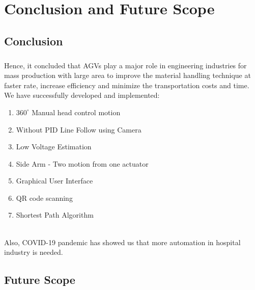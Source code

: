 \chapter{Conclusion and Future Scope}
\section{Conclusion}
\paragraph{}Hence, it concluded that AGVs play a major role in engineering industries for mass production with large area to improve the material handling technique at faster rate, increase efficiency and minimize the transportation costs and time. \\
\newline
We have successfully developed and implemented:
\begin{enumerate}
    \item $360^{\circ}$ Manual head control motion
    \item Without PID Line Follow using Camera
    \item Low Voltage Estimation
    \item Side Arm - Two motion from one actuator
    \item Graphical User Interface
    \item QR code scanning
    \item Shortest Path Algorithm
\end{enumerate}

\\Also, COVID-19 pandemic has showed us that more automation in hospital industry is needed.

\newpage

\section{Future Scope}

